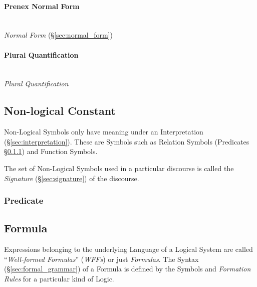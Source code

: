 \paragraph{Prenex Normal Form}\label{sec:prenex_normal}\hfill \\

\emph{Normal Form} (\S\ref{sec:normal_form})



\paragraph{Plural Quantification}\label{sec:plural_quantification}\hfill \\

\emph{Plural Quantification}



\subsection{Non-logical Constant}\label{sec:nonlogical_constant}

Non-Logical Symbols only have meaning under an Interpretation
(\S\ref{sec:interpretation}). These are Symbols such as Relation
Symbols (Predicates \S\ref{sec:predicate}) and Function Symbols.

The set of Non-Logical Symbols used in a particular discourse is
called the \emph{Signature} (\S\ref{sec:signature}) of the discourse.



\subsubsection{Predicate}\label{sec:predicate}



\subsection{Formula}\label{sec:formula}

Expressions belonging to the underlying Language of a Logical System
are called ``\emph{Well-formed Formulas}'' (\emph{WFFs}) or just
\emph{Formulas}. The Syntax (\S\ref{sec:formal_grammar}) of a Formula
is defined by the Symbols and \emph{Formation Rules} for a particular
kind of Logic.

